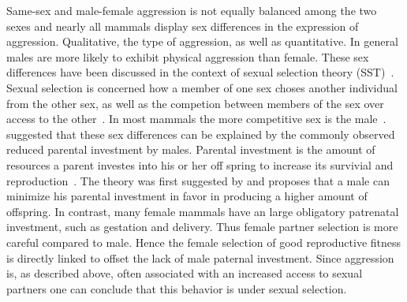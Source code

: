 Same-sex and male-female aggression is not equally balanced among the two sexes and nearly all mammals display sex differences in the expression of aggression.
Qualitative, the type of aggression, as well as quantitative.
In general males are more likely to exhibit physical aggression than female.
These sex differences have been discussed in the context of sexual selection theory (SST)~\cite{Archer2004,Anderson2002}. 
Sexual selection is concerned how a member of one sex choses another individual from the other sex, as well as the competion between members of the sex over access to the other~\cite{Darwin1859}.
In most mammals the more competitive sex is the male~\cite{Archer2009}. 
\citet{Trivers1972} suggested that these sex differences can be explained by the commonly observed reduced parental investment by males.
Parental investment is the amount of resources a parent investes into his or her off spring to increase its survivial and reproduction~\cite{Archer2009}.
The theory was first suggested by \citet{0198504403} and proposes that a male can minimize his parental investment in favor in producing a higher amount of offspring.
In contrast, many female mammals have an large obligatory patrenatal investment, such as gestation and delivery.
Thus female partner selection is more careful compared to male.
Hence the female selection of good reproductive fitness is directly linked to offset the lack of male paternal investment.
Since aggression is, as described above, often associated with an increased access to sexual partners one can conclude that this behavior is under sexual selection.

